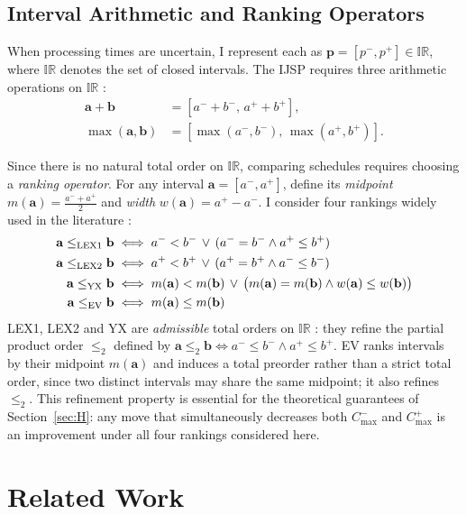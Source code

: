 \documentclass[preprint,12pt]{elsarticle}
\begin{document}
\subsection{Interval Arithmetic and Ranking Operators}
\label{sec:rankings}

When processing times are uncertain, I represent each as $\mathbf{p}=[p^-, p^+] \in \mathbb{IR}$, where $\mathbb{IR}$ denotes the set of closed intervals. The IJSP requires three arithmetic operations on $\mathbb{IR}$ \cite{Moore2009}:
\begin{align}
\mathbf{a} + \mathbf{b}        &= [a^- + b^-,\, a^+ + b^+], \\
\max(\mathbf{a},\mathbf{b})    &= [\max(a^-,b^-),\, \max(a^+,b^+)].
\end{align}

Since there is no natural total order on $\mathbb{IR}$, comparing schedules requires choosing a \emph{ranking operator}. For any interval $\mathbf{a}=[a^-,a^+]$, define its \emph{midpoint} $m(\mathbf{a})=\tfrac{a^-+a^+}{2}$ and \emph{width} $w(\mathbf{a})=a^+-a^-$. I consider four rankings widely used in the literature \cite{Bustince2013,Xu2006,Lei2012c}:
\begin{align}
\mathbf{a} \leq_{\rm LEX1} \mathbf{b} &\iff a^- < b^- \,\vee\, (a^- = b^- \wedge a^+ \leq b^+) \\
\mathbf{a} \leq_{\rm LEX2} \mathbf{b} &\iff a^+ < b^+ \,\vee\, (a^+ = b^+ \wedge a^- \leq b^-) \\
\mathbf{a} \leq_{\rm YX}   \mathbf{b} &\iff m(\mathbf{a}) < m(\mathbf{b}) \,\vee\, \bigl(m(\mathbf{a}) = m(\mathbf{b}) \wedge w(\mathbf{a}) \leq w(\mathbf{b})\bigr) \\
\mathbf{a} \leq_{\rm EV}   \mathbf{b} &\iff m(\mathbf{a}) \leq m(\mathbf{b})
\end{align}
LEX1, LEX2 and YX are \emph{admissible} total orders on $\mathbb{IR}$ \cite{Bustince2013}: they refine the partial product order $\leq_{2}$ defined by $\mathbf{a} \leq_{2} \mathbf{b} \iff a^- \leq b^- \wedge a^+ \leq b^+$. EV ranks intervals by their midpoint $m(\mathbf{a})$ and induces a total preorder rather than a strict total order, since two distinct intervals may share the same midpoint; it also refines $\leq_{2}$. This refinement property is essential for the theoretical guarantees of Section~\ref{sec:H}: any move that simultaneously decreases both $C^-_{\max}$ and $C^+_{\max}$ is an improvement under all four rankings considered here.

\section{Related Work}
\label{sec:rw}
\end{document}
